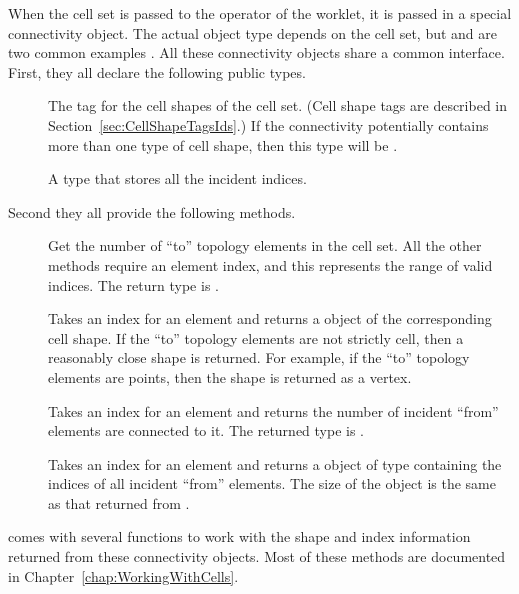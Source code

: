 When the cell set is passed to the operator of the worklet, it is passed in a special connectivity object.
The actual object type depends on the cell set, but  and are two common examples .
All these connectivity objects share a common interface.
First, they all declare the following public types.

\begin{description}
\item[]
  The tag for the cell shapes of the cell set.
  (Cell shape tags are described in Section~\ref{sec:CellShapeTagsIds}.)
  If the connectivity potentially contains more than one type of cell shape, then this type will be .
\item[]
  A \Veclike type that stores all the incident indices.
\end{description}

Second they all provide the following methods.

\begin{description}
\item[]
  Get the number of ``to'' topology elements in the cell set.
  All the other methods require an element index, and this represents the range of valid indices.
  The return type is .
\item[]
  Takes an index for an element and returns a  object of the corresponding cell shape.
  If the ``to'' topology elements are not strictly cell, then a reasonably close shape is returned.
  For example, if the ``to'' topology elements are points, then the shape is returned as a vertex.
\item[]
  Takes an index for an element and returns the number of incident ``from'' elements are connected to it.
  The returned type is .
\item[]
  Takes an index for an element and returns a \Veclike object of type  containing the indices of all incident ``from'' elements.
  The size of the \Veclike object is the same as that returned from .
\end{description}

\VTKm comes with several functions to work with the shape and index information returned from these connectivity objects.
Most of these methods are documented in Chapter~\ref{chap:WorkingWithCells}.

